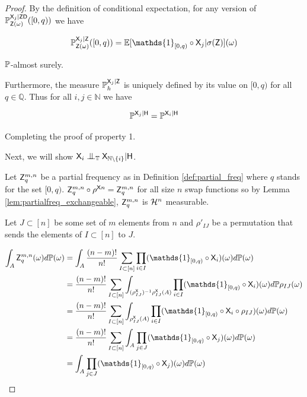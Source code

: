 \begin{proof}
By the definition of conditional expectation, for any version of $\mathbb{P}_{\mathsf{Z}(\omega)}^{\mathsf{X}_j|\mathsf{Z}\mathsf{D}}([0,q))$ we have

\begin{align}
    \prob{P}_{\RV{Z}(\omega)}^{\RV{X}_j|\RV{Z}}([0,q)) &= \mathbb{E}[\mathds{1}_{[0,q)}\circ \RV{X}_j|\sigma(\RV{Z})](\omega)\\
\end{align}

$\mathbb{P}$-almost surely.

Furthermore, the measure $\mathbb{P}_{h}^{\mathsf{X}_j|\mathsf{Z}}$ is uniquely defined by its value on $[0,q)$ for all $q\in \mathbb{Q}$. Thus for all $i,j\in \mathbb{N}$ we have

\begin{align}
    \mathbb{P}^{\mathsf{X}_j|\mathsf{H}} = \mathbb{P}^{\mathsf{X}_i|\mathsf{H}}
\end{align}

Completing the proof of property 1.

Next, we will show $\RV{X}_i\CI_\kernel{T} \RV{X}_{\mathbb{N}\setminus \{i\}} | \RV{H}$.

Let $\mathsf{Z}^{m,n}_q$ be a partial frequency as in Definition \ref{def:partial_freq} where $q$ stands for the set $[0,q)$. $\mathsf{Z}^{m,n}_q\circ \rho^{\mathsf{X}n}=\mathsf{Z}^{m,n}_q$ for all size $n$ swap functions so by Lemma \ref{lem:partialfreq_exchangeable}, $\mathsf{Z}^{m,n}_q$  is $\mathcal{H}^n$ measurable.

Let $J\subset[n]$ be some set of $m$ elements from $n$ and $\rho'_{IJ}$ be a permutation that sends the elements of $I\subset[n]$ to $J$.

\begin{align}
    \int_{A} \RV{Z}_q^{m,n} (\omega) d\prob{P}(\omega) &= \int_{A} \frac{(n-m)!}{n!}\sum_{I\subset[n]}\prod_{i\in I} (\mathds{1}_{[0,q)}\circ \RV{X}_i)(\omega)d\prob{P}(\omega)\\
    &= \frac{(n-m)!}{n!}\sum_{I\subset[n]} \int_{(\rho^{\RV{X}}_{IJ})^{-1}\rho^{\RV{X}}_{IJ}(A)} \prod_{i\in I}(\mathds{1}_{[0,q)}\circ \RV{X}_i)(\omega)d\prob{P}\rho_{IJ}(\omega)\label{eq:permutation_invertible}\\
    &= \frac{(n-m)!}{n!}\sum_{I\subset[n]} \int_{\rho^{\RV{X}}_{IJ}(A)} \prod_{i\in I}(\mathds{1}_{[0,q)}\circ \RV{X}_{i}\circ \rho_{IJ}) (\omega)d\prob{P}(\omega)\label{eq:using_pushforward}\\
    &= \frac{(n-m)!}{n!}\sum_{I\subset[n]} \int_{A} \prod_{j\in J}(\mathds{1}_{[0,q)}\circ \RV{X}_{j})(\omega)d\prob{P}(\omega)\label{eq:closure_under_permutation}\\
    &= \int_{A} \prod_{j\in J}(\mathds{1}_{[0,q)} \circ \RV{X}_j)(\omega)d\prob{P}(\omega) \label{eq:cond_expectation_first}
\end{align}


\end{proof}
